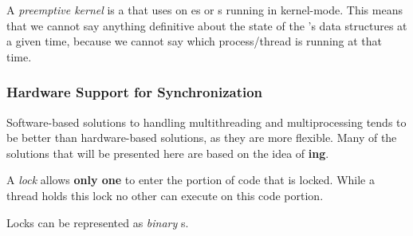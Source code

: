 \begin{definition}\label{def:Preemptive_Kernel}
  A \emph{preemptive kernel} is a  that uses  on es or s running in kernel-mode.
  This means that we cannot say anything definitive about the state of the 's data structures at a given time, because we cannot say which process/thread is running at that time.
\end{definition}

\subsubsection{Hardware Support for Synchronization}\label{subsubsec:Hardware_Support_Synchronization}
Software-based solutions to handling multithreading and multiprocessing tends to be better than hardware-based solutions, as they are more flexible.
Many of the solutions that will be presented here are based on the idea of \textbf{ing}.

\begin{definition}[Lock]\label{def:Lock}
  A \emph{lock} allows \textbf{only one}  to enter the portion of code that is locked.
  While a thread holds this lock no other  can execute on this code portion.

  \begin{remark}\label{rmk:Binary_Semaphore}
    Locks can be represented as \emph{binary }s.
  \end{remark}
\end{definition}

